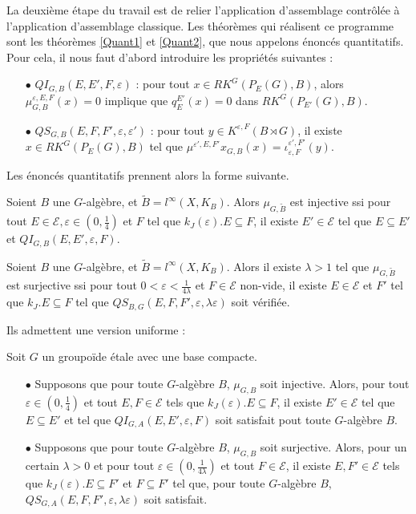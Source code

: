 La deuxième étape du travail est de relier l'application d'assemblage contrôlée à l'application d'assemblage classique. Les théorèmes qui réalisent ce programme sont les théorèmes \ref{Quant1} et \ref{Quant2}, que nous appelons énoncés quantitatifs. Pour cela, il nous faut d'abord introduire les propriétés suivantes :
\begin{itemize}
\item[$\bullet$] $QI_{G,B}(E,E',F,\varepsilon)$ : pour tout $x\in RK^G(P_E(G), B )$, alors $\mu^{\varepsilon,E,F}_{G,B}(x) = 0$ implique que $q_E^{E'}(x)=0$ dans $RK^G(P_{E'}(G),B)$.
\item[$\bullet$] $QS_{G,B}(E,F,F',\varepsilon,\varepsilon')$ : pour tout $y\in K^{\varepsilon,F}(B\rtimes G)$, il existe $x\in RK^G(P_E(G),B)$ tel que $\mu^{\varepsilon',E,F'}x_{G,B}(x)=\iota_{\varepsilon,F}^{\varepsilon',F'}(y)$.\\
\end{itemize} 

Les énoncés quantitatifs prennent alors la forme suivante.

\begin{thm}
Soient $B$ une $G$-algèbre, et $\tilde B = l^\infty(X,K_B)$. Alors $\mu_{G,\tilde B}$ est injective ssi pour tout $E\in\mathcal E,\varepsilon\in(0,\frac{1}{4})$ et $F$ tel que $k_J(\varepsilon).E\subseteq F$, il existe $E' \in\mathcal E$ tel que $E\subseteq E'$ et $QI_{G,B}(E,E',\varepsilon,F)$. 
\end{thm}

\begin{thm}
Soient $B$ une $G$-algèbre, et $\tilde B = l^\infty(X,K_B)$. Alors il existe $\lambda>1$ tel que $\mu_{G,\tilde B}$ est surjective ssi pour tout $0<\varepsilon<\frac{1}{4\lambda}$ et $F\in\mathcal E$ non-vide, il existe $E\in\mathcal E$ et $F'$ tel que $k_J .E \subseteq F$ tel que $QS_{B,G}(E,F,F',\varepsilon,\lambda\varepsilon)$ soit vérifiée.
\end{thm}

Ils admettent une version uniforme :
\begin{thm} Soit $G$ un groupoïde étale avec une base compacte. 
\begin{itemize}
\item[$\bullet$] Supposons que pour toute $G$-algèbre $B$, $\mu_{G,B}$ soit injective. Alors, pour tout $\varepsilon\in (0,\frac{1}{4})$ et tout $E,F\in\mathcal E$ tels que $k_J(\varepsilon). E\subseteq F$, il existe $E'\in\mathcal E$ tel que $E\subseteq E'$ et tel que $QI_{G,A}(E,E',\varepsilon,F)$ soit satisfait pout toute $G$-algèbre $B$.
\item[$\bullet$] Supposons que pour toute $G$-algèbre $B$, $\mu_{G,B}$ soit surjective. Alors, pour un certain $\lambda>0$ et pour tout $\varepsilon\in (0,\frac{1}{4\lambda})$ et tout $F\in\mathcal E$, il existe $E,F'\in\mathcal E$ tels que $k_J(\varepsilon). E\subseteq F'$ et $F\subseteq F'$ tel que, pour toute $G$-algèbre $B$, $QS_{G,A}(E, F,F',\varepsilon,\lambda \varepsilon)$ soit satisfait.
\end{itemize}
\end{thm}

